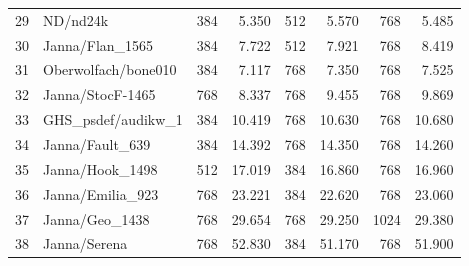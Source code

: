 \begin{tabular}{rl|rr|rr|rr}
  29     & ND/nd24k                        & 384                              & 5.350  & 512       & 5.570  & 768  & 5.485  \\
  30     & Janna/Flan\_1565                & 384                              & 7.722  & 512       & 7.921  & 768  & 8.419  \\
  31     & Oberwolfach/bone010             & 384                              & 7.117  & 768       & 7.350  & 768  & 7.525  \\
  32     & Janna/StocF-1465                & 768                              & 8.337  & 768       & 9.455  & 768  & 9.869  \\
  33     & GHS\_psdef/audikw\_1            & 384                              & 10.419 & 768       & 10.630 & 768  & 10.680 \\
  34     & Janna/Fault\_639                & 384                              & 14.392 & 768       & 14.350 & 768  & 14.260 \\
  35     & Janna/Hook\_1498                & 512                              & 17.019 & 384       & 16.860 & 768  & 16.960 \\
  36     & Janna/Emilia\_923               & 768                              & 23.221 & 384       & 22.620 & 768  & 23.060 \\
  37     & Janna/Geo\_1438                 & 768                              & 29.654 & 768       & 29.250 & 1024 & 29.380 \\
  38     & Janna/Serena                    & 768                              & 52.830 & 384       & 51.170 & 768  & 51.900 \\
  \hline
\end{tabular}
